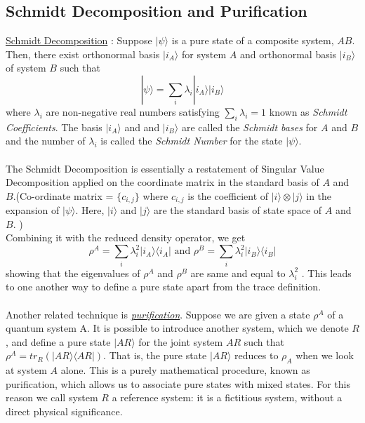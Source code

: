 \subsection{Schmidt Decomposition and Purification}
\href{https://en.wikipedia.org/wiki/Schmidt_decomposition}{Schmidt Decomposition} :  Suppose $|\psi \rangle $ is a pure state of a composite system, $AB$. Then, there exist orthonormal basis $|i_A \rangle$ for system $A$ and orthonormal basis $|i_B \rangle$ of system $B$ such that 
\begin{equation}
|\psi \rangle = \sum_i \lambda_i |i_A \rangle|i_B \rangle
\end{equation}
where $\lambda_i$ are non-negative real numbers satisfying $\sum_i \lambda_i = 1$ known as \textit{Schmidt Coefficients}. The basis $|i_A\rangle$ and and $|i_B\rangle$ are called the \textit{Schmidt bases} for $A$ and $B$ and the number of $\lambda_i$ is called the \textit{Schmidt Number} for the state $|\psi\rangle$. \\
\\The Schmidt Decomposition is essentially a restatement of Singular Value Decomposition applied on the coordinate matrix in the standard basis of $A$ and $B$.(Co-ordinate matrix = $\{ c_{i,j}\}$ where $c_{i,j}$ is the coefficient of $|i\rangle \otimes |j\rangle$ in the expansion of $|\psi\rangle$. Here, $|i\rangle $ and $|j\rangle$ are the standard basis of state space of $A$ and $B$. )\\
Combining it with the reduced density operator, we get 
\begin{equation}
\rho^A = \sum_i \lambda_i^2 |i_A \rangle \langle i_A | \text{ and } \rho^B = \sum_i \lambda_i^2 |i_B \rangle \langle i_B | 
\end{equation}showing that the eigenvalues of $\rho^A$ and $\rho^B$ are same and equal to $\lambda_i^2$ . This leads to one another way to define a pure state apart from the trace definition.\\
\\Another related technique is \href{https://en.wikipedia.org/wiki/Purification_of_quantum_state}{\it purification}.  Suppose we are given a state $\rho^A$ of a quantum system A. It is possible to introduce another system, which we denote $R$, and define a pure state $|AR\rangle$ for the joint system $AR$ such that $\rho^A = tr_R (|AR\rangle \langle AR|)$. That is, the pure state $|AR\rangle$ reduces to $\rho_A$ when we look at system $A$ alone. This is a purely mathematical procedure, known as purification, which allows us to associate pure states with mixed states. For this reason we call system $R$ a reference system: it is a fictitious system, without a direct physical significance.\\
